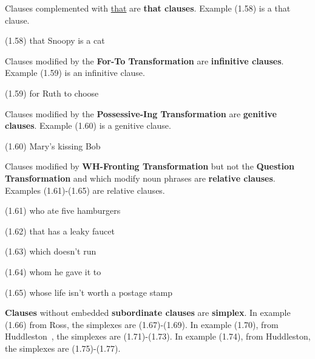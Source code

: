 \documentclass{article}
\begin{document}
Clauses complemented with \underline{that} are \textbf{that clauses}.
Example (1.58) is a that clause.

\begin{enumerate*}
\item[(1.58)] that Snoopy is a cat
\end{enumerate*}

Clauses modified by the \textbf{For-To Transformation} are
\textbf{infinitive clauses}. Example (1.59) is an infinitive
clause.

\begin{enumerate*}
\item[(1.59)] for Ruth to choose
\end{enumerate*}

Clauses modified by the \textbf{Possessive-Ing Transformation}
are \textbf{genitive clauses}. Example (1.60) is a genitive
clause.

\begin{enumerate*}
\item[(1.60)] Mary's kissing Bob
\end{enumerate*}

Clauses modified by \textbf{WH-Fronting Transformation} but not
the \textbf{Question Transformation} and which modify noun
phrases are \textbf{relative clauses}. Examples (1.61)-(1.65)
are relative clauses.

\begin{enumerate*}
\item[(1.61)] who ate five hamburgers
\item[(1.62)] that has a leaky faucet
\item[(1.63)] which doesn't run
\item[(1.64)] whom he gave it to
\item[(1.65)] whose life isn't worth a postage stamp
\end{enumerate*}

\textbf{Clauses} without embedded \textbf{subordinate clauses}
are \textbf{simplex}. In example (1.66) from
Ross\cite{Ross67}, the simplexes are (1.67)-(1.69). In example
(1.70), from Huddleston~\cite{Huddleston78}, the simplexes are
(1.71)-(1.73). In example (1.74), from Huddleston, the simplexes
are (1.75)-(1.77).
\end{document}
